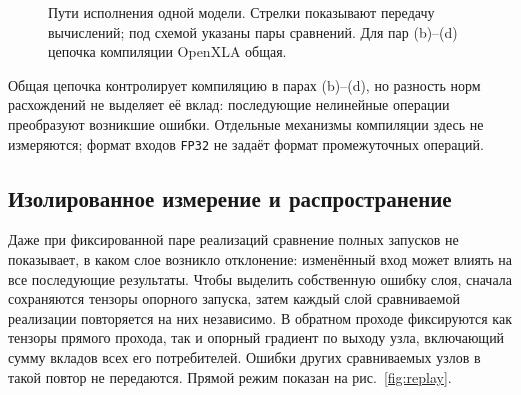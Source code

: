 \begin{figure}[htbp]
    \centering
    \caption{Пути исполнения одной модели.
        Стрелки показывают передачу вычислений; под схемой указаны
        пары сравнений. Для пар (b)--(d) цепочка компиляции OpenXLA общая.}
    \label{fig:configs}
\end{figure}

Общая цепочка контролирует компиляцию в парах (b)--(d),
но разность норм расхождений не выделяет её вклад:
последующие нелинейные операции преобразуют возникшие ошибки.
Отдельные механизмы компиляции здесь не измеряются;
формат входов \texttt{FP32} не задаёт формат промежуточных операций.

\subsection{Изолированное измерение и распространение}

Даже при фиксированной паре реализаций сравнение полных запусков
не показывает, в каком слое возникло отклонение: изменённый вход может
влиять на все последующие результаты. Чтобы выделить собственную
ошибку слоя, сначала сохраняются тензоры опорного запуска, затем каждый
слой сравниваемой реализации повторяется на них независимо.
В обратном проходе фиксируются как тензоры
прямого прохода, так и опорный градиент по выходу узла, включающий
сумму вкладов всех его потребителей. Ошибки других сравниваемых узлов
в такой повтор не передаются. Прямой режим показан на рис.~\ref{fig:replay}.


